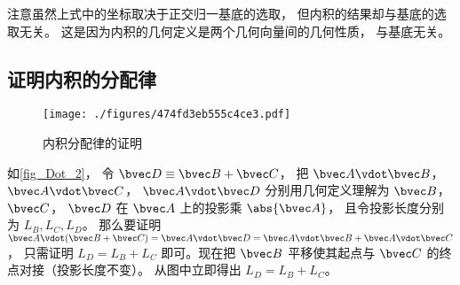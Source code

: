 注意虽然上式中的坐标取决于正交归一基底的选取， 但内积的结果却与基底的选取无关。 这是因为内积的几何定义是两个几何向量间的几何性质， 与基底无关。

\subsection{证明内积的分配律}
\begin{figure}[ht]
\centering
\texttt{[image: ./figures/474fd3eb555c4ce3.pdf]}
\caption{内积分配律的证明} \label{fig_Dot_2}
\end{figure}

如\autoref{fig_Dot_2}， 令 $\bvec D \equiv \bvec B + \bvec C$， 把 $\bvec A \vdot \bvec B$，  $\bvec A \vdot \bvec C$，  $\bvec A \vdot \bvec D$ 分别用几何定义理解为 $\bvec B$，  $\bvec C$，  $\bvec D$ 在 $\bvec A$ 上的投影乘 $\abs{\bvec A}$， 且令投影长度分别为 $L_B, L_C, L_D$。 那么要证明 $\bvec A \vdot (\bvec B + \bvec C) = \bvec A \vdot \bvec D = \bvec A \vdot \bvec B + \bvec A \vdot \bvec C$， 只需证明 $L_D = L_B + L_C$ 即可。现在把 $\bvec B$ 平移使其起点与 $\bvec C$ 的终点对接（投影长度不变）。 从图中立即得出 $L_D = L_B + L_C$。  

